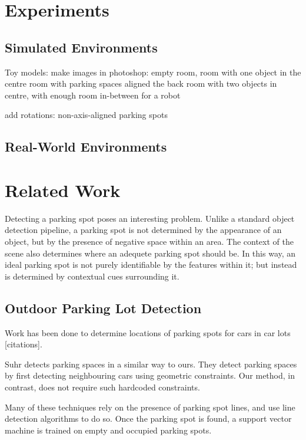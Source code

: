 \section{Experiments}

\subsection{Simulated Environments}
Toy models: make images in photoshop:
empty room,
room with one object in the centre
room with parking spaces aligned the back
room with two objects in centre, with enough room in-between for a robot

add rotations:
non-axis-aligned parking spots

\subsection{Real-World Environments}

\section{Related Work}
\label{sec:parkinglotidentificationlitreview}
Detecting a parking spot poses an interesting problem. Unlike a standard object
detection pipeline, a parking spot is not determined by the appearance of an
object, but by the presence of negative space within an area. The context of the
scene also determines where an adequete parking spot should be. In this way, an
ideal parking spot is not purely identifiable by the features within it; but
instead is determined by contextual cues surrounding it.


\subsection{Outdoor Parking Lot Detection}
Work has been done to determine locations of parking spots for cars in car lots
[citations]. 
\cite{wu2006parking, true2007vacant}

Suhr \cite{suhr2010automatic} detects parking spaces in a similar way to ours.
They detect parking spaces by first detecting neighbouring cars using geometric
constraints. Our method, in contrast, does not require such hardcoded
constraints.


Many of these techniques rely on the presence of parking spot
lines, and use line detection algorithms to do so. Once the parking spot is
found, a support vector machine is trained on empty and occupied parking spots.

